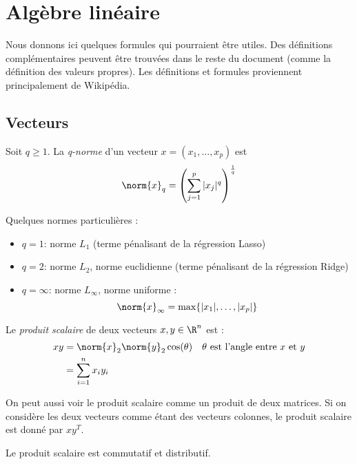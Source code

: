 \section{Algèbre linéaire}
    Nous donnons ici quelques formules qui pourraient être utiles. Des définitions complémentaires peuvent être trouvées dans le reste du document (comme la définition des valeurs propres). Les définitions et formules proviennent principalement de Wikipédia.

    \subsection{Vecteurs}
        \begin{definition}
            Soit \(q \geq 1\). La \textit{q-norme} d'un vecteur \(x = (x_1, \dots, x_p)\) est
            \[
                \norm{x}_q = \left(\sum_{j=1}^p |x_j|^q\right)^{\frac{1}{q}}
            \]

            Quelques normes particulières :
            \begin{itemize}
                \item \(q = 1\): norme \(L_1\) (terme pénalisant de la régression Lasso)
                \item \(q = 2\): norme \(L_2\), norme euclidienne (terme pénalisant de la régression Ridge)
                \item \(q = \infty\): norme \(L_\infty\), norme uniforme :
                \[
                    \norm{x}_\infty = \max\{|x_1|, \dots, |x_p|\}
                \]
            \end{itemize}
        \end{definition}

        \begin{definition}
            Le \textit{produit scalaire} de deux vecteurs \(x, y \in \R^n\) est :
            \begin{align*}
                xy &= \norm{x}_2 \norm{y}_2 \cos(\theta) & \theta \text{ est l'angle entre \(x\) et \(y\)} \\
                &= \sum_{i=1}^n x_i y_i
            \end{align*}

            On peut aussi voir le produit scalaire comme un produit de deux matrices. Si on considère les deux vecteurs comme étant des vecteurs colonnes, le produit scalaire est donné par \(xy^T\).

            Le produit scalaire est commutatif et distributif.
        \end{definition}

